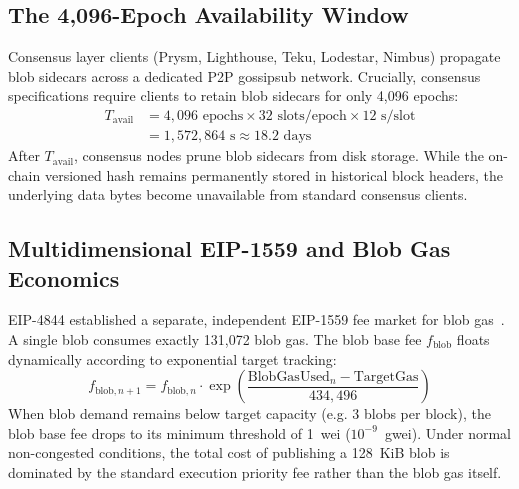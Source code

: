 \subsection{The 4,096-Epoch Availability Window}
Consensus layer clients (Prysm, Lighthouse, Teku, Lodestar, Nimbus) propagate blob sidecars across a dedicated P2P gossipsub network. Crucially, consensus specifications require clients to retain blob sidecars for only 4,096 epochs:
\begin{align}
T_{\text{avail}} &= 4,096 \text{ epochs} \times 32 \text{ slots/epoch} \times 12 \text{ s/slot} \nonumber \\
&= 1,572,864 \text{ s} \approx 18.2 \text{ days}
\end{align}
After $T_{\text{avail}}$, consensus nodes prune blob sidecars from disk storage. While the on-chain versioned hash remains permanently stored in historical block headers, the underlying data bytes become unavailable from standard consensus clients.

\subsection{Multidimensional EIP-1559 and Blob Gas Economics}
EIP-4844 established a separate, independent EIP-1559 fee market for blob gas~\cite{roughgarden2021eip1559}. A single blob consumes exactly 131,072 blob gas. The blob base fee $f_{\text{blob}}$ floats dynamically according to exponential target tracking:
\begin{equation}
f_{\text{blob}, n+1} = f_{\text{blob}, n} \cdot \exp\left( \frac{\text{BlobGasUsed}_n - \text{TargetGas}}{434,496} \right)
\end{equation}
When blob demand remains below target capacity (e.g. 3 blobs per block), the blob base fee drops to its minimum threshold of 1~wei ($10^{-9}$~gwei). Under normal non-congested conditions, the total cost of publishing a 128~KiB blob is dominated by the standard execution priority fee rather than the blob gas itself.
